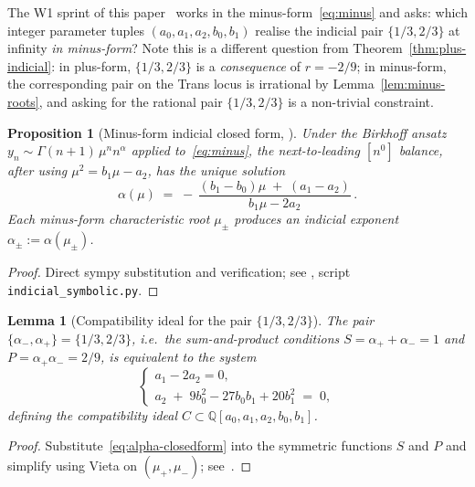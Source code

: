 \documentclass[11pt]{amsart}
\newtheorem{proposition}[theorem]{Proposition}
\newtheorem{lemma}[theorem]{Lemma}
\theoremstyle{definition}
\theoremstyle{remark}
\newcommand{\Q}{\mathbb{Q}}
\begin{document}
The W1 sprint of this paper~\cite{SprintW1Report} works in the
minus-form~\eqref{eq:minus} and asks: which integer parameter tuples
$(a_0,a_1,a_2,b_0,b_1)$ realise the indicial pair $\{1/3,2/3\}$ at
infinity \emph{in minus-form}?  Note this is a different question
from Theorem~\ref{thm:plus-indicial}: in plus-form, $\{1/3,2/3\}$ is
a \emph{consequence} of $r=-2/9$; in minus-form, the corresponding
pair on the Trans locus is irrational by Lemma~\ref{lem:minus-roots},
and asking for the rational pair $\{1/3,2/3\}$ is a non-trivial
constraint.

\begin{proposition}[Minus-form indicial closed form,
\cite{SprintW1Report}]
\label{prop:minus-indicial}
Under the Birkhoff ansatz $y_n \sim \Gamma(n+1)\,\mu^n n^\alpha$
applied to~\eqref{eq:minus}, the next-to-leading $[n^0]$ balance,
after using $\mu^2 = b_1\mu - a_2$, has the unique solution
\begin{equation}\label{eq:alpha-closedform}
  \alpha(\mu) \;=\; -\,\frac{(b_1 - b_0)\mu \;+\; (a_1 - a_2)}%
                            {b_1\mu - 2 a_2}\,.
\end{equation}
Each minus-form characteristic root $\mu_\pm$ produces an indicial
exponent $\alpha_\pm := \alpha(\mu_\pm)$.
\end{proposition}
\begin{proof}
Direct sympy substitution and verification; see
\cite[]{SprintW1Report}, script
\texttt{indicial\_symbolic.py}.
\end{proof}

\begin{lemma}[Compatibility ideal for the pair $\{1/3,2/3\}$]
\label{lem:compat-ideal}
The pair $\{\alpha_-,\alpha_+\} = \{1/3,2/3\}$, i.e.\ the
sum-and-product conditions $S = \alpha_++\alpha_- = 1$ and $P =
\alpha_+\alpha_- = 2/9$, is equivalent to the system
\[
  \begin{cases}
    a_1 - 2 a_2 = 0,\\
    a_2 \;+\; 9 b_0^2 - 27 b_0 b_1 + 20 b_1^2 \;=\; 0,
  \end{cases}
\]
defining the compatibility ideal $C \subset
\Q[a_0,a_1,a_2,b_0,b_1]$.
\end{lemma}
\begin{proof}
Substitute~\eqref{eq:alpha-closedform} into the symmetric functions
$S$ and $P$ and simplify using Vieta on $(\mu_+,\mu_-)$;
see~\cite[]{SprintW1Report}.
\end{proof}
\end{document}
